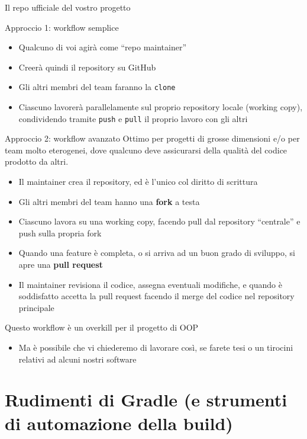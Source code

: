 \documentclass[xcolor=dvipsnames,presentation]{beamer}
\begin{document}
\begin{frame}[allowframebreaks]{Il repo ufficiale del vostro progetto}
	\begin{block}{Approccio 1: workflow semplice}
		\begin{itemize}
			\item Qualcuno di voi agirà come ``repo maintainer''
			\item Creerà quindi il repository su GitHub
			\item Gli altri membri del team faranno la \texttt{clone}
			\item Ciascuno lavorerà parallelamente sul proprio repository locale (working copy), condividendo tramite \texttt{push} e \texttt{pull} il proprio lavoro con gli altri
		\end{itemize}
	\end{block}
	\begin{block}{Approccio 2: workflow avanzato}
		Ottimo per progetti di grosse dimensioni e/o per team molto eterogenei, dove qualcuno deve assicurarsi della qualità del codice prodotto da altri.
		\begin{itemize}
			\item Il maintainer crea il repository, ed è l'unico col diritto di scrittura
			\item Gli altri membri del team hanno una \textbf{fork} a testa
			\item Ciascuno lavora su una working copy, facendo pull dal repository ``centrale'' e push sulla propria fork
			\item Quando una feature è completa, o si arriva ad un buon grado di sviluppo, si apre una \textbf{pull request}
			\item Il maintainer revisiona il codice, assegna eventuali modifiche, e quando è soddisfatto accetta la pull request facendo il merge del codice nel repository principale
		\end{itemize}
		Questo workflow è un overkill per il progetto di OOP
		\begin{itemize}
			\item Ma è possibile che vi chiederemo di lavorare così, se farete tesi o un tirocini relativi ad alcuni nostri software
		\end{itemize}
	\end{block}
\end{frame}

\section{Rudimenti di Gradle (e strumenti di automazione della build)}
\end{document}
